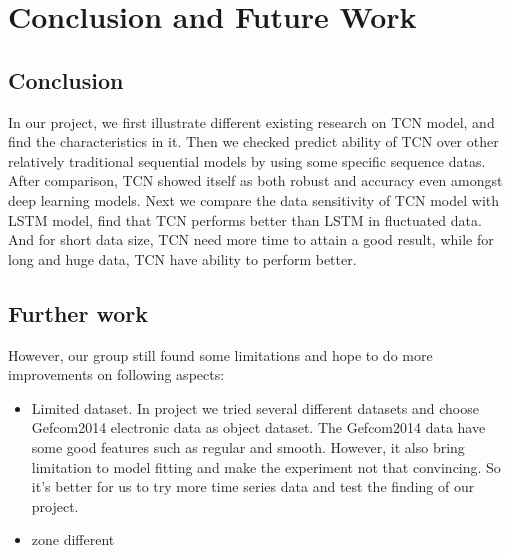 
\chapter{Conclusion and Future Work} %

\label{Chapter5} %


\section{Conclusion}
In our project, we first illustrate different existing research on TCN model, and find the characteristics in it. Then we checked predict ability of TCN over other relatively traditional sequential models by using some specific sequence datas. After comparison, TCN showed itself as both robust and accuracy even amongst deep learning models. Next we compare the data sensitivity of TCN model with LSTM model, find that TCN performs better than LSTM in fluctuated data. And for short data size, TCN need more time to attain a good result, while for long and huge data, TCN have ability to perform better.

\section{Further work}
However, our group still found some limitations and hope to do more improvements on following aspects:
\begin{itemize}
    \item Limited dataset. In project we tried several different datasets and choose Gefcom2014 electronic data as object dataset. The Gefcom2014 data have some good features such as regular and smooth. However, it also bring limitation to model fitting and make the experiment not that convincing. So it's better for us to try more time series data and test the finding of our project. 
    \item zone different
\end{itemize}